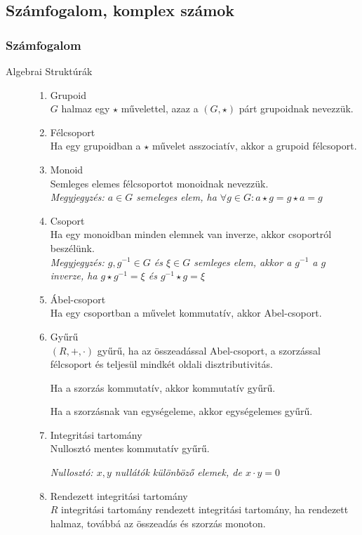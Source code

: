 \documentclass[margin=0px]{article}
\begin{document}
		\subsection{Számfogalom, komplex számok}
			\subsubsection{Számfogalom}
				\begin{description}
					\item[Algebrai Struktúrák] \hfill
						\begin{enumerate}
							\item Grupoid \\
								$G$ halmaz egy $\star$ művelettel, azaz a $(G, \star)$ párt grupoidnak nevezzük.
							\item Félcsoport\\
								Ha egy grupoidban a $\star$ művelet asszociatív, akkor a grupoid félcsoport.
							\item Monoid \\
								Semleges elemes félcsoportot monoidnak nevezzük.\\
								\textit{Megyjegyzés: $ a \in G$ semeleges elem, ha $\forall g \in G : a \star g = g \star a = g$}
							\item Csoport \\
								Ha egy monoidban minden elemnek van inverze, akkor csoportról beszélünk. \\
								\textit{Megyjegyzés: $g,g^{-1} \in G$ és $\xi\in G$ semleges elem, akkor a $g^{-1}$ a $g$ inverze, ha $g\star g^{-1} = \xi$ és $g^{-1} \star g = \xi$}
							\item Ábel-csoport \\
								Ha egy csoportban a művelet kommutatív, akkor Abel-csoport.
							\item Gyűrű \\
								$(R,+,\cdot )$ gyűrű, ha az összeadással Abel-csoport, a szorzással félcsoport és teljesül mindkét oldali disztributivitás.
								
								Ha a szorzás kommutatív, akkor kommutatív gyűrű. 
								
								Ha a szorzásnak van egységeleme, akkor egységelemes gyűrű.
							\item Integritási tartomány \\
								Nullosztó mentes kommutatív gyűrű.
								
								\textit{Nullosztó: $x,y$ nullátók különböző elemek, de $x\cdot y = 0$}
							\item Rendezett integritási tartomány \\
								$R$ integritási tartomány rendezett integritási tartomány, ha rendezett halmaz, továbbá az összeadás és szorzás monoton.
								

\end{enumerate}
\end{description}
\end{document}
